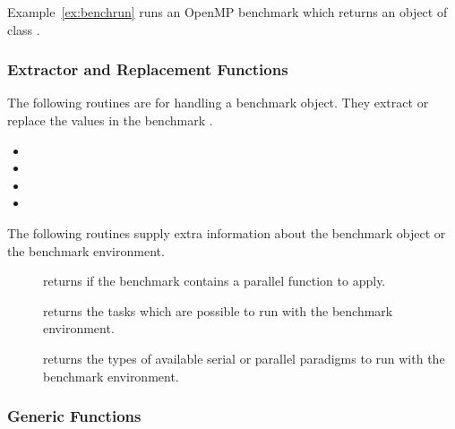 Example~\ref{ex:benchrun} runs an OpenMP benchmark which returns an
object of class .




\subsubsection{Extractor and Replacement Functions}

The following routines are for handling a benchmark object. They
extract or replace the values in the benchmark .

\begin{itemize}
\item {}
\item {}
\item {}
\item {}
\end{itemize}

The following routines supply extra information about the benchmark object
or the benchmark environment.

\begin{description}
\item[] returns  if the benchmark
  contains a parallel function to apply. 
\item[] returns the tasks which are possible to run
  with the benchmark environment.
\item[] returns the types of available serial or
  parallel paradigms to run with the benchmark environment.
\end{description}

\subsubsection{Generic Functions}

